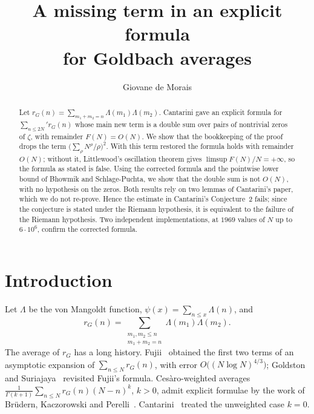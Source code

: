 \documentclass[11pt]{amsart}
\theoremstyle{definition}
\theoremstyle{remark}
\numberwithin{equation}{section}
\newcommand{\rG}{r_G}
\newcommand{\Ca}{\cite{Ca}}
\begin{document}
\title{A missing term in an explicit formula\\ for Goldbach averages}
\author{Giovane de Morais}
\address{Centro de Compet\^encia em Manufatura (CCM), Graduate Program in Aeronautical and Mechanical Engineering, Instituto Tecnol\'ogico de Aeron\'autica (ITA), S\~ao Jos\'e dos Campos, SP, Brazil}


\begin{abstract}
Let $\rG(n)=\sum_{m_1+m_2=n}\Lambda(m_1)\Lambda(m_2)$. Cantarini gave an explicit
formula for $\sum_{n\le 2N}' \rG(n)$ whose main new term is a double sum over pairs of
nontrivial zeros of $\zeta$, with remainder $F(N)=O(N)$. We show that the bookkeeping
of the proof drops the term $\bigl(\sum_\rho N^\rho/\rho\bigr)^2$. With this term
restored the formula holds with remainder $O(N)$; without it, Littlewood's
oscillation theorem gives $\limsup F(N)/N=+\infty$, so the formula as stated is false.
Using the corrected formula and the pointwise lower bound of Bhowmik and
Schlage-Puchta, we show that the double sum is not $O(N)$, with no hypothesis on the
zeros. Both results rely on two lemmas of Cantarini's paper, which we do not re-prove.
Hence the estimate in Cantarini's Conjecture~2 fails; since the conjecture is
stated under the Riemann hypothesis, it is equivalent to the failure of the Riemann
hypothesis. Two independent implementations, at $1969$ values of $N$ up to
$6\cdot10^6$, confirm the corrected formula.
\end{abstract}

\maketitle

\section{Introduction}\label{sec:intro}

Let $\Lambda$ be the von Mangoldt function, $\psi(x)=\sum_{n\le x}\Lambda(n)$, and
\[
  \rG(n)=\sum_{\substack{m_1,m_2\le n\\ m_1+m_2=n}}\Lambda(m_1)\Lambda(m_2).
\]
The average of $\rG$ has a long history. Fujii~\cite{Fu} obtained the first two terms
of an asymptotic expansion of $\sum_{n\le N}\rG(n)$, with error
$O\bigl((N\log N)^{4/3}\bigr)$; Goldston and Suriajaya~\cite{GS} revisited Fujii's
formula.
Cesàro-weighted averages $\frac{1}{\Gamma(k+1)}\sum_{n\le N}\rG(n)(N-n)^k$, $k>0$,
admit explicit formulae by the work of Brüdern, Kaczorowski and Perelli~\cite{BKP}.
Cantarini~\Ca{} treated the unweighted case $k=0$.
\end{document}
